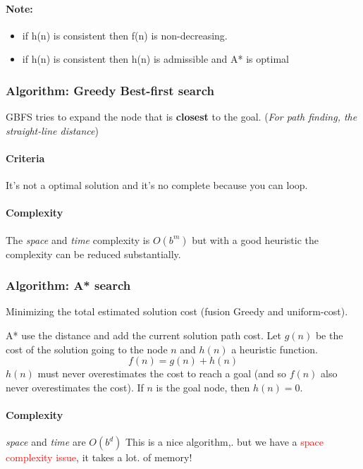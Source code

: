 \paragraph{Note:} 
	\begin{itemize}
		\item if h(n) is consistent then f(n) is non-decreasing.
		\item if h(n) is consistent then h(n) is admissible and A* is optimal
	\end{itemize}
\subsubsection{Algorithm: Greedy Best-first search}
GBFS tries to expand the node that is \textbf{closest} to the goal.
(\textit{For path finding, the straight-line distance})

\paragraph{Criteria} It's not a optimal solution and it's no complete
because you can loop.

\paragraph{Complexity} The \textit{space} and \textit{time} complexity
is $O(b^m)$ but with a good heuristic the complexity can be reduced
substantially.


\subsubsection{Algorithm: A* search}
Minimizing the total estimated solution cost (fusion Greedy and uniform-cost).

A* use the  distance and add the current solution  path cost. Let $g(n)$
be the cost of the solution going to the node $n$ and $h(n)$ a heuristic
function. $$f(n)  = g(n)  + h(n)$$ $h(n)$  must never  overestimates the
cost to reach a goal (and  so $f(n)$ also never overestimates the cost).
If $n$ is the goal node, then $h(n) = 0$.

\paragraph{Complexity}

\textit{space} and \textit{time} are $O(b^d)$  This is a nice algorithm,.
but we have  a \textcolor{red}{space complexity issue}, it  takes a lot.
of memory!

